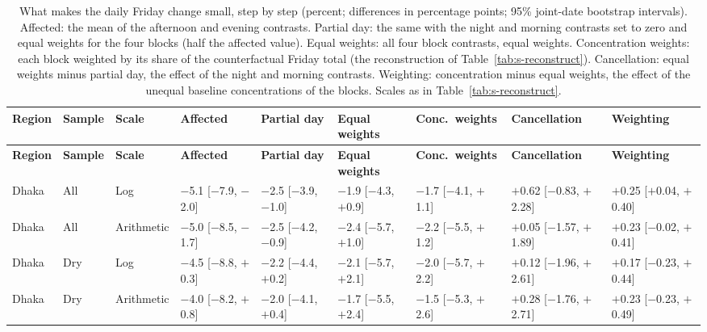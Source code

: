 \begingroup\scriptsize
\begin{longtable}{L{1.2cm} L{1.1cm} L{1.4cm} C{1.75cm} C{1.75cm} C{1.75cm} C{1.75cm} C{1.75cm} C{1.75cm}}
\caption{What makes the daily Friday change small, step by step (percent; differences in percentage points; 95\% joint-date bootstrap intervals). Affected: the mean of the afternoon and evening contrasts. Partial day: the same with the night and morning contrasts set to zero and equal weights for the four blocks (half the affected value). Equal weights: all four block contrasts, equal weights. Concentration weights: each block weighted by its share of the counterfactual Friday total (the reconstruction of Table~\ref{tab:s-reconstruct}). Cancellation: equal weights minus partial day, the effect of the night and morning contrasts. Weighting: concentration minus equal weights, the effect of the unequal baseline concentrations of the blocks. Scales as in Table~\ref{tab:s-reconstruct}.}\label{tab:s-decompose}\\
\toprule
\textbf{Region} & \textbf{Sample} & \textbf{Scale} & \textbf{Affected} & \textbf{Partial day} & \textbf{Equal weights} & \textbf{Conc.\ weights} & \textbf{Cancel\-lation} & \textbf{Weighting} \\
\midrule\endfirsthead
\toprule
\textbf{Region} & \textbf{Sample} & \textbf{Scale} & \textbf{Affected} & \textbf{Partial day} & \textbf{Equal weights} & \textbf{Conc.\ weights} & \textbf{Cancel\-lation} & \textbf{Weighting} \\
\midrule\endhead
\bottomrule\endfoot
Dhaka & All & Log & $-$5.1 {\scriptsize[$-$7.9, $-$2.0]} & $-$2.5 {\scriptsize[$-$3.9, $-$1.0]} & $-$1.9 {\scriptsize[$-$4.3, $+$0.9]} & $-$1.7 {\scriptsize[$-$4.1, $+$1.1]} & $+$0.62 {\scriptsize[$-$0.83, $+$2.28]} & $+$0.25 {\scriptsize[$+$0.04, $+$0.40]} \\
Dhaka & All & Arithmetic & $-$5.0 {\scriptsize[$-$8.5, $-$1.7]} & $-$2.5 {\scriptsize[$-$4.2, $-$0.9]} & $-$2.4 {\scriptsize[$-$5.7, $+$1.0]} & $-$2.2 {\scriptsize[$-$5.5, $+$1.2]} & $+$0.05 {\scriptsize[$-$1.57, $+$1.89]} & $+$0.23 {\scriptsize[$-$0.02, $+$0.41]} \\
Dhaka & Dry & Log & $-$4.5 {\scriptsize[$-$8.8, $+$0.3]} & $-$2.2 {\scriptsize[$-$4.4, $+$0.2]} & $-$2.1 {\scriptsize[$-$5.7, $+$2.1]} & $-$2.0 {\scriptsize[$-$5.7, $+$2.2]} & $+$0.12 {\scriptsize[$-$1.96, $+$2.61]} & $+$0.17 {\scriptsize[$-$0.23, $+$0.44]} \\
Dhaka & Dry & Arithmetic & $-$4.0 {\scriptsize[$-$8.2, $+$0.8]} & $-$2.0 {\scriptsize[$-$4.1, $+$0.4]} & $-$1.7 {\scriptsize[$-$5.5, $+$2.4]} & $-$1.5 {\scriptsize[$-$5.3, $+$2.6]} & $+$0.28 {\scriptsize[$-$1.76, $+$2.71]} & $+$0.23 {\scriptsize[$-$0.23, $+$0.49]} \\

\end{longtable}
